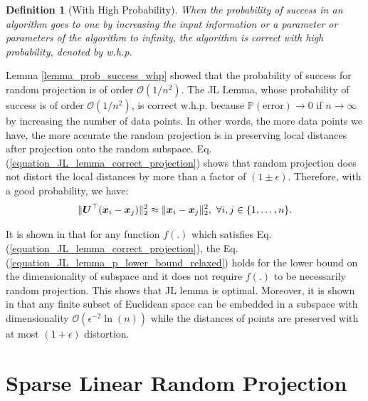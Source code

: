 \documentclass{article}
\newtheorem{definition}{Definition}
\def\b{\ensuremath\boldsymbol}
\begin{document}
\begin{definition}[With High Probability]
When the probability of success in an algorithm goes to one by increasing the input information or a parameter or parameters of the algorithm to infinity, the algorithm is correct with high probability, denoted by w.h.p.
\end{definition}

Lemma \ref{lemma_prob_success_whp} showed that the probability of success for random projection is of order $\mathcal{O}(1/n^2)$. 
The JL Lemma, whose probability of success is of order $\mathcal{O}(1/n^2)$, is correct w.h.p. because $\mathbb{P}(\text{error}) \rightarrow 0$ if $n \rightarrow \infty$ by increasing the number of data points. In other words, the more data points we have, the more accurate the random projection is in preserving local distances after projection onto the random subspace. 
Eq. (\ref{equation_JL_lemma_correct_projection}) shows that random projection does not distort the local distances by more than a factor of $(1 \pm \epsilon)$. Therefore, with a good probability, we have:
\begin{align}
\|\b{U}^\top (\b{x}_i - \b{x}_j)\|_2^2 \approx \|\b{x}_i - \b{x}_j\|_2^2,\,\, \forall i,j \in \{1, \dots, n\}.
\end{align}

It is shown in \cite{larsen2017optimality} that for any function $f(.)$ which satisfies Eq. (\ref{equation_JL_lemma_correct_projection}), the Eq. (\ref{equation_JL_lemma_p_lower_bound_relaxed}) holds for the lower bound on the dimensionality of subspace and it does not require $f(.)$ to be necessarily random projection. This shows that JL lemma is optimal. 
Moreover, it is shown in \cite{bartal2011dimensionality} that any finite subset of Euclidean space can be embedded in a subspace with dimensionality $\mathcal{O}(\epsilon^{-2} \ln(n))$ while the distances of points are preserved with at most $(1+\epsilon)$ distortion. 

\section{Sparse Linear Random Projection}\label{section_sparse_linear_random_projection}
\end{document}
